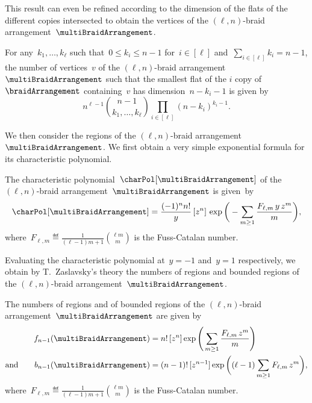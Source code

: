 This result can even be refined according to the dimension of the flats of the different copies intersected to obtain the vertices of the $(\ell,n)$-braid arrangement~$\multiBraidArrangement$.

\begin{theorem*}
For any~$k_1, \dots, k_\ell$ such that~$0 \le k_i \le n-1$ for~$i \in [\ell]$ and~${\sum_{i \in [\ell]} k_i = n-1}$, the number of vertices~$v$ of the $(\ell,n)$-braid arrangement~$\multiBraidArrangement$ such that the smallest flat of the $i$\ordinal{} copy of~$\braidArrangement$ containing~$v$ has dimension~$n-k_i-1$ is given by
\[
n^{\ell-1} \binom{n-1}{k_1, \dots, k_\ell} \prod_{i \in [\ell]} (n-k_i)^{k_i-1}.
\]
\end{theorem*}

We then consider the regions of the $(\ell,n)$-braid arrangement~$\multiBraidArrangement$.
We first obtain a very simple exponential formula for its characteristic polynomial.

\begin{theorem*}
The characteristic polynomial~$\charPol[\multiBraidArrangement]$ of the $(\ell,n)$-braid arrangement~$\multiBraidArrangement$ is given~by
\[
\charPol[\multiBraidArrangement] = \frac{(-1)^n n!}{y} \, [z^n] \, \exp \bigg( - \sum_{m \ge 1} \frac{F_{\ell,m} \, y \, z^m}{m} \bigg) ,
\]
where~$\displaystyle F_{\ell,m} \eqdef \frac{1}{(\ell-1)m+1} \binom{\ell m}{m}$ is the Fuss-Catalan number.
\end{theorem*}

Evaluating the characteristic polynomial at~$y = -1$ and~$y = 1$ respectively, we obtain by T.~Zaslavsky's theory the numbers of regions and bounded regions of the $(\ell,n)$-braid arrangement~$\multiBraidArrangement$.

\begin{theorem*}
The numbers of regions and of bounded regions of the $(\ell,n)$-braid arrangement~$\multiBraidArrangement$ are given by
\begin{align*}
f_{n-1}(\multiBraidArrangement) 
& = n! \, [z^n] \exp \Bigg( \sum_{m \ge 1} \frac{F_{\ell,m} \, z^m}{m} \Bigg) \\
\text{and}\qquad
b_{n-1}(\multiBraidArrangement)
& = (n-1)! \, [z^{n-1}] \exp \bigg( (\ell-1) \sum_{m \ge 1} F_{\ell,m} \, z^m \bigg),
\end{align*}
where~$\displaystyle F_{\ell,m} \eqdef \frac{1}{(\ell-1)m+1} \binom{\ell m}{m}$ is the Fuss-Catalan number.
\end{theorem*}

